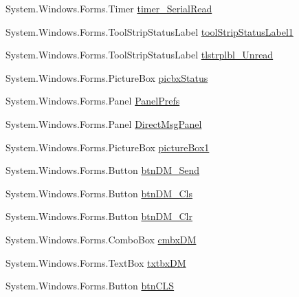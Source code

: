 \begin{DoxyCompactItemize}
\item 
\-System.\-Windows.\-Forms.\-Timer \hyperlink{class_sr_p___classroom_inq_1_1frm_classrrom_inq_ae222e5fb7d4ed8ef65c9c3ff836cecf6}{timer\-\_\-\-Serial\-Read}
\item 
\-System.\-Windows.\-Forms.\-Tool\-Strip\-Status\-Label \hyperlink{class_sr_p___classroom_inq_1_1frm_classrrom_inq_ad0f9f7002296a43527da34b1f476ce4e}{tool\-Strip\-Status\-Label1}
\item 
\-System.\-Windows.\-Forms.\-Tool\-Strip\-Status\-Label \hyperlink{class_sr_p___classroom_inq_1_1frm_classrrom_inq_afe9bef57098dfe8005fc34664f678826}{tlstrplbl\-\_\-\-Unread}
\item 
\-System.\-Windows.\-Forms.\-Picture\-Box \hyperlink{class_sr_p___classroom_inq_1_1frm_classrrom_inq_a5252272b4880f9a8d5ecf8fcd1828873}{picbx\-Status}
\item 
\-System.\-Windows.\-Forms.\-Panel \hyperlink{class_sr_p___classroom_inq_1_1frm_classrrom_inq_aac0efdb76f2989a17842359cc1a15ec9}{\-Panel\-Prefs}
\item 
\-System.\-Windows.\-Forms.\-Panel \hyperlink{class_sr_p___classroom_inq_1_1frm_classrrom_inq_a3241f0f690675052aff4224bc4fabc3d}{\-Direct\-Msg\-Panel}
\item 
\-System.\-Windows.\-Forms.\-Picture\-Box \hyperlink{class_sr_p___classroom_inq_1_1frm_classrrom_inq_ab971146df86e1277868bef4199a7b8f4}{picture\-Box1}
\item 
\-System.\-Windows.\-Forms.\-Button \hyperlink{class_sr_p___classroom_inq_1_1frm_classrrom_inq_a5633d72d43c108b34eb912acdcc81878}{btn\-D\-M\-\_\-\-Send}
\item 
\-System.\-Windows.\-Forms.\-Button \hyperlink{class_sr_p___classroom_inq_1_1frm_classrrom_inq_a2e01fdc50400702fd6df6d5d785ddb4d}{btn\-D\-M\-\_\-\-Cls}
\item 
\-System.\-Windows.\-Forms.\-Button \hyperlink{class_sr_p___classroom_inq_1_1frm_classrrom_inq_a81852ce0a99da9e3b5838befcb9daedc}{btn\-D\-M\-\_\-\-Clr}
\item 
\-System.\-Windows.\-Forms.\-Combo\-Box \hyperlink{class_sr_p___classroom_inq_1_1frm_classrrom_inq_a3d1c3cd1ef0f02e6e927a4fd741672e5}{cmbx\-D\-M}
\item 
\-System.\-Windows.\-Forms.\-Text\-Box \hyperlink{class_sr_p___classroom_inq_1_1frm_classrrom_inq_aec9084c69e8f5c7398f201a074db8550}{txtbx\-D\-M}
\item 
\-System.\-Windows.\-Forms.\-Button \hyperlink{class_sr_p___classroom_inq_1_1frm_classrrom_inq_a750ba6df4c36e55bb0b4211c0915d63c}{btn\-C\-L\-S}

\end{DoxyCompactItemize}
